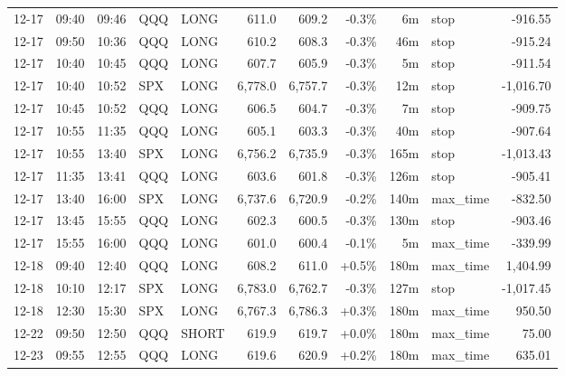 \documentclass[11pt,a4paper,twoside]{article}
\begin{document}
\begin{center}
\begin{longtable}{>{\color{txtmain}}l l l l l r r r r >{\color{txtmain}}l r}
12-17 & 09:40 & 09:46 & QQQ & LONG & 611.0 & 609.2 & \textcolor{lossred}{-0.3\%} & 6m & stop & \textcolor{lossred}{-916.55} \\
12-17 & 09:50 & 10:36 & QQQ & LONG & 610.2 & 608.3 & \textcolor{lossred}{-0.3\%} & 46m & stop & \textcolor{lossred}{-915.24} \\
12-17 & 10:40 & 10:45 & QQQ & LONG & 607.7 & 605.9 & \textcolor{lossred}{-0.3\%} & 5m & stop & \textcolor{lossred}{-911.54} \\
12-17 & 10:40 & 10:52 & SPX & LONG & 6,778.0 & 6,757.7 & \textcolor{lossred}{-0.3\%} & 12m & stop & \textcolor{lossred}{-1,016.70} \\
12-17 & 10:45 & 10:52 & QQQ & LONG & 606.5 & 604.7 & \textcolor{lossred}{-0.3\%} & 7m & stop & \textcolor{lossred}{-909.75} \\
12-17 & 10:55 & 11:35 & QQQ & LONG & 605.1 & 603.3 & \textcolor{lossred}{-0.3\%} & 40m & stop & \textcolor{lossred}{-907.64} \\
12-17 & 10:55 & 13:40 & SPX & LONG & 6,756.2 & 6,735.9 & \textcolor{lossred}{-0.3\%} & 165m & stop & \textcolor{lossred}{-1,013.43} \\
12-17 & 11:35 & 13:41 & QQQ & LONG & 603.6 & 601.8 & \textcolor{lossred}{-0.3\%} & 126m & stop & \textcolor{lossred}{-905.41} \\
12-17 & 13:40 & 16:00 & SPX & LONG & 6,737.6 & 6,720.9 & \textcolor{lossred}{-0.2\%} & 140m & max\_time & \textcolor{lossred}{-832.50} \\
12-17 & 13:45 & 15:55 & QQQ & LONG & 602.3 & 600.5 & \textcolor{lossred}{-0.3\%} & 130m & stop & \textcolor{lossred}{-903.46} \\
12-17 & 15:55 & 16:00 & QQQ & LONG & 601.0 & 600.4 & \textcolor{lossred}{-0.1\%} & 5m & max\_time & \textcolor{lossred}{-339.99} \\
12-18 & 09:40 & 12:40 & QQQ & LONG & 608.2 & 611.0 & \textcolor{wingreen}{+0.5\%} & 180m & max\_time & \textcolor{wingreen}{1,404.99} \\
12-18 & 10:10 & 12:17 & SPX & LONG & 6,783.0 & 6,762.7 & \textcolor{lossred}{-0.3\%} & 127m & stop & \textcolor{lossred}{-1,017.45} \\
12-18 & 12:30 & 15:30 & SPX & LONG & 6,767.3 & 6,786.3 & \textcolor{wingreen}{+0.3\%} & 180m & max\_time & \textcolor{wingreen}{950.50} \\
12-22 & 09:50 & 12:50 & QQQ & SHORT & 619.9 & 619.7 & \textcolor{wingreen}{+0.0\%} & 180m & max\_time & \textcolor{wingreen}{75.00} \\
12-23 & 09:55 & 12:55 & QQQ & LONG & 619.6 & 620.9 & \textcolor{wingreen}{+0.2\%} & 180m & max\_time & \textcolor{wingreen}{635.01} \\

\end{longtable}
\end{center}
\end{document}
